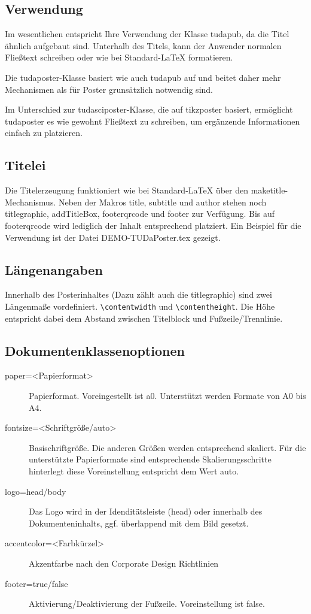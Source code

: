 \documentclass[
	paper=a0,
	ngerman,
	accentcolor=9c,
	logo=body,%
	footer=true,
	]{tudaposter}
\begin{document}
\begin{multicols}{2}
\subsection*{Verwendung}
Im wesentlichen entspricht Ihre Verwendung der Klasse tudapub, da die Titel ähnlich aufgebaut sind. Unterhalb des Titels, kann der Anwender normalen Fließtext schreiben oder wie bei Standard-\LaTeX{} formatieren.

Die tudaposter-Klasse basiert wie auch tudapub auf \KOMAScript{} und beitet daher mehr Mechanismen als für Poster grunsätzlich notwendig sind.

Im Unterschied zur tudasciposter-Klasse, die auf tikzposter basiert, ermöglicht tudaposter es wie gewohnt Fließtext zu schreiben, um ergänzende Informationen einfach zu platzieren.

\subsection*{Titelei}
Die Titelerzeugung funktioniert wie bei Standard-\LaTeX{} über den maketitle-Mechanismus. Neben der Makros title, subtitle und author stehen noch 
titlegraphic, addTitleBox, footerqrcode und footer zur Verfügung. Bis auf footerqrcode wird lediglich der Inhalt entsprechend platziert. Ein Beispiel für die Verwendung ist der Datei DEMO-TUDaPoster.tex gezeigt.

\subsection*{Längenangaben}
Innerhalb des Posterinhaltes (Dazu zählt auch die titlegraphic) sind zwei Längenmaße vordefiniert.
\texttt{\textbackslash{}contentwidth} und \texttt{\textbackslash{}contentheight}. Die Höhe entspricht dabei dem Abstand zwischen Titelblock und Fußzeile/Trennlinie.

\subsection*{Dokumentenklassenoptionen}
\begin{description}
	\item[paper=<Papierformat>] Papierformat. Voreingestellt ist a0. Unterstützt werden Formate von A0 bis A4. 
	\item[fontsize=<Schriftgröße/auto>] Basischriftgröße. Die anderen Größen werden entsprechend skaliert. Für die unterstützte Papierformate sind entsprechende Skalierungsschritte hinterlegt diese Voreinstellung entspricht dem Wert auto.
	\item[logo=head/body] Das Logo wird in der Idenditätsleiste (head) oder innerhalb des Dokumenteninhalts, ggf. überlappend mit dem Bild gesetzt.
	\item[accentcolor=<Farbkürzel>] Akzentfarbe nach den Corporate Design Richtlinien
	\item[footer=true/false] Aktivierung/Deaktivierung der Fußzeile. Voreinstellung ist false.
\end{description}
\end{multicols}
\end{document}
